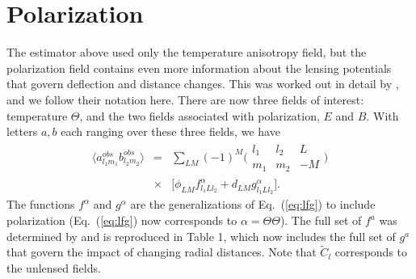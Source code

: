 \documentclass[prl,amsmath,amssymb,floatfix,superscriptaddress,nofootinbib,twocolumn]{revtex4-1}
\def\bea{\begin{eqnarray}}
\def\eea{\end{eqnarray}}
\newcommand{\ec}[1]{Eq.~(\ref{eq:#1})}
\begin{document}
\section{Polarization}

The estimator above used only the temperature anisotropy field, but the polarization field contains even more information about the lensing potentials that govern deflection and distance changes. This was worked out in detail by \citet{Okamoto:2003zw}, and we follow their notation here. There are now three fields of interest: temperature $\Theta$, and the two fields associated with polarization, $E$ and $B$. With letters $a,b$ each ranging over these three fields, we have 
\bea
\langle a^{obs}_{l_{1}m_{1}}b^{obs}_{l_{2}m_{2}}\rangle &=& \sum_{LM}(-1)^{M}\bigl(\begin{smallmatrix} l_1 & l_2 & L \\ m_1 & m_2 & -M  \end{smallmatrix}\bigr)\nonumber \\
&\times&
\big[ \phi_{LM}f^{\alpha}_{l_{1}Ll_{2}} + d_{LM}g^{\alpha}_{l_{1}Ll_{2}} \big] 
.\eea
The functions $f^\alpha$ and $g^\alpha$ are the generalizations of \ec{lfg} to include polarization (\ec{lfg} now corresponds to $\alpha=\Theta\Theta$). The full set of $f^a$ was determined by \citet{Okamoto:2003zw} and is reproduced in Table 1, which now includes the full set of $g^a$ that govern the impact of changing radial distances. Note that $\tilde C_l$ corresponds to the unlensed fields.
\end{document}
